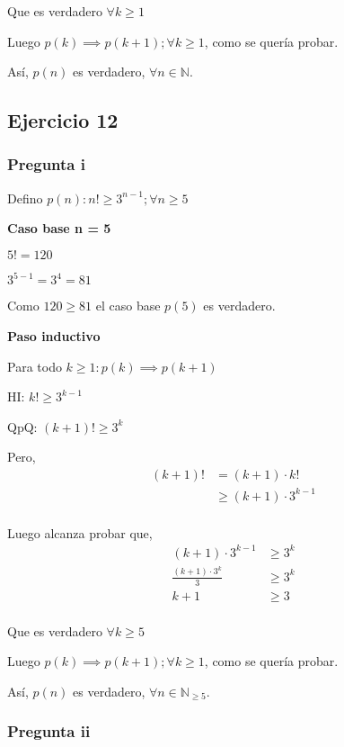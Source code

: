 Que es verdadero $\forall k \geq 1$

Luego $p(k) \implies p(k+1); \forall k \geq 1$, como se quería probar.

Así, $p(n)$ es verdadero, $\forall n \in \mathbb{N}$.

\subsection{Ejercicio 12}

\subsubsection{Pregunta i}

Defino $ p(n): n! \geq 3^{n-1}; \forall n \geq 5 $

\textbf{Caso base n = 5}

$ 5! = 120 $

$ 3^{5-1} = 3^4 = 81$

Como $ 120 \geq 81 $ el caso base $p(5)$ es verdadero.

\textbf{Paso inductivo}

Para todo $k \geq 1: p(k) \implies p(k+1)$

HI: $k! \geq 3^{k-1}$

QpQ: $ (k+1)! \geq 3^{k}$

Pero,
\begin{align*}
    (k+1)! &= (k+1) \cdot k! \\
    &\geq (k+1) \cdot 3^{k-1} \\
\end{align*}

Luego alcanza probar que,
\begin{align*}
    (k+1) \cdot 3^{k-1} &\geq 3^{k} \\
    \frac{(k+1)\cdot 3^k}{3} &\geq 3^{k} \\
    k+1 &\geq 3 \\
\end{align*}

Que es verdadero $\forall k \geq 5$

Luego $p(k) \implies p(k+1); \forall k \geq 1$, como se quería probar.

Así, $p(n)$ es verdadero, $\forall n \in \mathbb{N}_{\geq 5}$.

\subsubsection{Pregunta ii}

